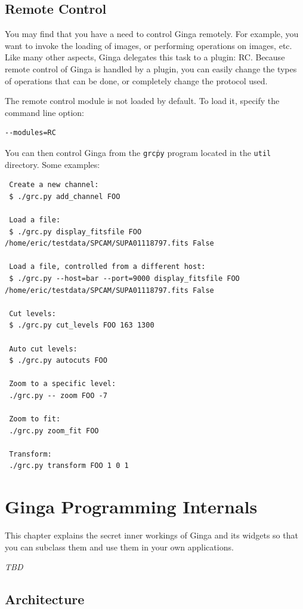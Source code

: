 \documentclass[11pt]{report}
\begin{document}
\section{Remote Control}
\label{sec:remotecontrol}
You may find that you have a need to control Ginga remotely.  For
example, you want to invoke the loading of images, or performing
operations on images, etc.  Like many other aspects, Ginga delegates this
task to a plugin: RC.  
Because remote control of Ginga is handled by a plugin, you can easily
change the types of operations that can be done, or completely change
the protocol used.

The remote control module is not loaded by default.  To load it, specify
the command line option:
\begin{verbatim}
--modules=RC
\end{verbatim}

You can then control Ginga from the {\tt grc\.py} program located in the 
{\tt util} directory.  Some examples:
\begin{verbatim}
 Create a new channel:
 $ ./grc.py add_channel FOO
 
 Load a file:
 $ ./grc.py display_fitsfile FOO /home/eric/testdata/SPCAM/SUPA01118797.fits False

 Load a file, controlled from a different host:
 $ ./grc.py --host=bar --port=9000 display_fitsfile FOO /home/eric/testdata/SPCAM/SUPA01118797.fits False

 Cut levels:
 $ ./grc.py cut_levels FOO 163 1300

 Auto cut levels:
 $ ./grc.py autocuts FOO

 Zoom to a specific level:
 ./grc.py -- zoom FOO -7
 
 Zoom to fit:
 ./grc.py zoom_fit FOO
 
 Transform:
 ./grc.py transform FOO 1 0 1
\end{verbatim}

\chapter{Ginga Programming Internals}
\label{ch:internals}
This chapter explains the secret inner workings of Ginga and its widgets
so that you can subclass them and use them in your own applications.

\emph{TBD}

\section{Architecture}
\end{document}
